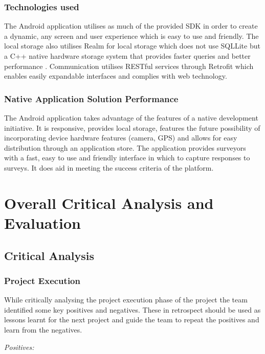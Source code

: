 \documentclass[12pt]{witseiepaper}
\begin{document}
\subsubsection{Technologies used}
The Android application utilises as much of the provided SDK in order to create a dynamic, any screen and user experience which is easy to use and friendly. The local storage also utilises Realm  for local storage which does not use SQLLite but a C++ native hardware storage system that provides faster queries and better performance \cite{RealmPerformance}. Communication utilises RESTful services through Retrofit \cite{retrofit} which enables easily expandable interfaces and complies with web technology.

\subsubsection{Native Application Solution Performance}
The Android application takes advantage of the features of a native development initiative. It is responsive, provides local storage, features the future possibility of incorporating device hardware features (camera, GPS) and allows for easy distribution through an application store. The application provides surveyors with a fast, easy to use and friendly interface in which to capture responses to surveys. It does aid in meeting the success criteria of the platform.\\

\section{Overall Critical Analysis and Evaluation}

\subsection{Critical Analysis}


\subsubsection{Project Execution}
While critically analysing the project execution phase of the project the team identified some key positives and negatives. These in retrospect should be used as lessons learnt for the next project and guide the team to repeat the positives and learn from the negatives.

\textit{Positives:}
\end{document}
